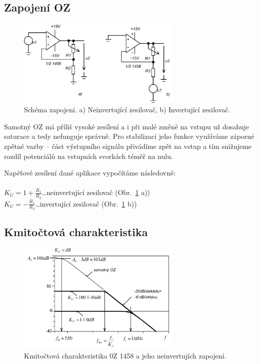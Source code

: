 \documentclass{protokol}
\begin{document}
	\subsection{Zapojení OZ}

		\begin{figure}[h!]
			\centering
			\includegraphics[width=0.7\textwidth]{schema.png}
			\centering
			\caption{Schéma zapojení. a) Neinvertující zesilovač, b) Invertující zesilovač.}
			\label{fig:schema}
		\end{figure}
	
	Samotný OZ má příliš vysoké zesílení a i při malé změně na vstupu už dosahuje saturace a tedy nefunguje správně. Pro stabilizaci jeho funkce využíváme záporné zpětné vazby -- část výstupního signálu přivádíme zpět na vstup a tím snižujeme rozdíl potenciálů na vstupních svorkách téměř na nulu.
	
	Napěťové zesílení dané aplikace vypočítáme následovně:\\\\
	$ K_U=1+\frac{R_1}{R_2}$\dots neinvertující zesilovač (Obr.~\ref{fig:schema} a))\\
	$ K_U=-\frac{R_1}{R_2}$\dots invertující zesilovač (Obr.~\ref{fig:schema} b))\\	
		
	
	\subsection{Kmitočtová charakteristika}
	
	\begin{figure}[h!]
		\centering
		\includegraphics[width=0.7\textwidth]{kmitoctova.png}
		\centering
		\caption{Kmitočtová charakteristika 0Z 1458 a jeho neinvertujích zapojení.}
		\label{fig:kmitoctova_charakteristika}
	\end{figure}
\end{document}
